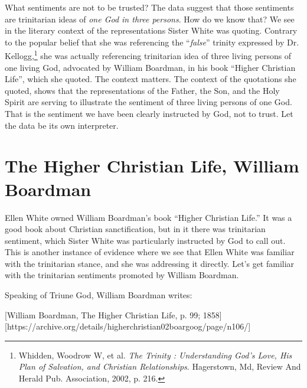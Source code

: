 What sentiments are not to be trusted? The data suggest that those sentiments are trinitarian ideas of \textit{one God in three persons}. How do we know that? We see in the literary context of the representations Sister White was quoting. Contrary to the popular belief that she was referencing the “\textit{false}” trinity expressed by Dr. Kellogg,\footnote{Whidden, Woodrow W, et al. \textit{The Trinity : Understanding God’s Love, His Plan of Salvation, and Christian Relationships}. Hagerstown, Md, Review And Herald Pub. Association, 2002, p. 216.} she was actually referencing trinitarian idea of three living persons of one living God, advocated by William Boardman, in his book “Higher Christian Life”, which she quoted. The context matters. The context of the quotations she quoted, shows that the representations of the Father, the Son, and the Holy Spirit are serving to illustrate the sentiment of three living persons of one God. That is the sentiment we have been clearly instructed by God, not to trust. Let the data be its own interpreter.

\section*{The Higher Christian Life, William Boardman}

Ellen White owned William Boardman's book “Higher Christian Life.” It was a good book about Christian sanctification, but in it there was trinitarian sentiment, which Sister White was particularly instructed by God to call out. This is another instance of evidence where we see that Ellen White was familiar with the trinitarian stance, and she was addressing it directly. Let's get familiar with the trinitarian sentiments promoted by William Boardman.

Speaking of Triune God, William Boardman writes:

[William Boardman, The Higher Christian Life, p. 99; 1858][https://archive.org/details/higherchristian02boargoog/page/n106/]

